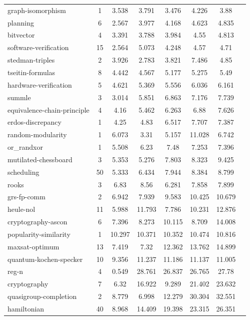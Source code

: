 \documentclass[12pt,a4paper,twoside]{scrartcl}
\numberwithin{equation}{section}
\begin{document}
\begin{longtable}{ lccccccc }
  graph-isomorphism	&	1	&	3.538	&	3.791	&	3.476	&	4.226	&	3.88	\\
  planning	&	6	&	2.567	&	3.977	&	4.168	&	4.623	&	4.835	\\
  bitvector	&	4	&	3.391	&	3.788	&	3.984	&	4.55	&	4.813	\\
  software-verification	&	15	&	2.564	&	5.073	&	4.248	&	4.57	&	4.71	\\
  stedman-triples	&	2	&	3.926	&	2.783	&	3.821	&	7.486	&	4.85	\\
  tseitin-formulas	&	8	&	4.442	&	4.567	&	5.177	&	5.275	&	5.49	\\
  hardware-verification	&	5	&	4.621	&	5.369	&	5.556	&	6.036	&	6.161	\\
  summle	&	3	&	3.014	&	5.851	&	6.863	&	7.176	&	7.739	\\
  equivalence-chain-principle	&	4	&	4.16	&	5.462	&	6.263	&	6.88	&	7.626	\\
  erdos-discrepancy	&	1	&	4.25	&	4.83	&	6.517	&	7.707	&	7.387	\\
  random-modularity	&	1	&	6.073	&	3.31	&	5.157	&	11.028	&	6.742	\\
  or\_randxor	&	1	&	5.508	&	6.23	&	7.48	&	7.253	&	7.396	\\
  mutilated-chessboard	&	3	&	5.353	&	5.276	&	7.803	&	8.323	&	9.425	\\
  scheduling	&	50	&	5.333	&	6.434	&	7.944	&	8.384	&	8.799	\\
  rooks	&	3	&	6.83	&	8.56	&	6.281	&	7.858	&	7.899	\\
  grs-fp-comm	&	2	&	6.942	&	7.939	&	9.583	&	10.425	&	10.679	\\
  heule-nol	&	11	&	5.988	&	11.793	&	7.786	&	10.231	&	12.876	\\
  cryptography-ascon	&	6	&	7.396	&	8.273	&	10.115	&	8.709	&	14.008	\\
  popularity-similarity	&	1	&	10.297	&	10.371	&	10.352	&	10.474	&	10.816	\\
  maxsat-optimum	&	13	&	7.419	&	7.32	&	12.362	&	13.762	&	14.899	\\
  quantum-kochen-specker	&	10	&	9.356	&	11.237	&	11.186	&	11.137	&	11.005	\\
  reg-n	&	4	&	0.549	&	28.761	&	26.837	&	26.765	&	27.78	\\
  cryptography	&	7	&	6.32	&	16.922	&	9.289	&	21.402	&	23.632	\\
  quasigroup-completion	&	2	&	8.779	&	6.998	&	12.279	&	30.304	&	32.551	\\
  hamiltonian	&	40	&	8.968	&	14.409	&	19.398	&	23.315	&	26.351	\\

\end{longtable}
\end{document}
